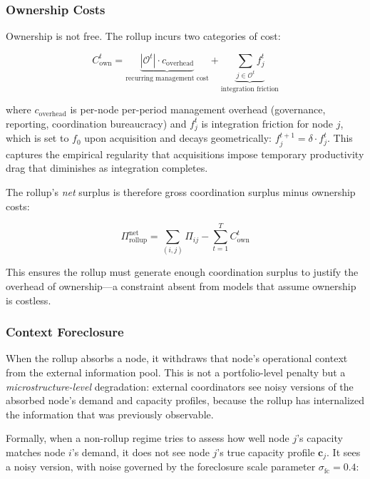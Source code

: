 \documentclass[12pt]{article}
\theoremstyle{definition}
\begin{document}
\subsubsection{Ownership Costs}
\label{sec:ownership_costs}

Ownership is not free. The rollup incurs two categories of cost:

\begin{equation}
\label{eq:owncost}
C_{\text{own}}^t = \underbrace{|\mathcal{O}^t| \cdot c_{\text{overhead}}}_{\text{recurring management cost}} + \underbrace{\sum_{j \in \mathcal{O}^t} f_j^t}_{\text{integration friction}}
\end{equation}

\noindent where $c_{\text{overhead}}$ is per-node per-period management overhead (governance, reporting, coordination bureaucracy) and $f_j^t$ is integration friction for node $j$, which is set to $f_0$ upon acquisition and decays geometrically: $f_j^{t+1} = \delta \cdot f_j^t$. This captures the empirical regularity that acquisitions impose temporary productivity drag that diminishes as integration completes.

The rollup's \textit{net} surplus is therefore gross coordination surplus minus ownership costs:

\begin{equation}
\Pi_{\text{rollup}}^{\text{net}} = \sum_{(i,j)} \Pi_{ij} - \sum_{t=1}^{T} C_{\text{own}}^t
\end{equation}

This ensures the rollup must generate enough coordination surplus to justify the overhead of ownership---a constraint absent from models that assume ownership is costless.

\subsubsection{Context Foreclosure}
\label{sec:foreclosure}

When the rollup absorbs a node, it withdraws that node's operational context from the external information pool. This is not a portfolio-level penalty but a \textit{microstructure-level} degradation: external coordinators see noisy versions of the absorbed node's demand and capacity profiles, because the rollup has internalized the information that was previously observable.

Formally, when a non-rollup regime tries to assess how well node $j$'s capacity matches node $i$'s demand, it does not see node $j$'s true capacity profile $\mathbf{c}_j$. It sees a noisy version, with noise governed by the foreclosure scale parameter $\sigma_{\text{fc}} = 0.4$:
\end{document}
